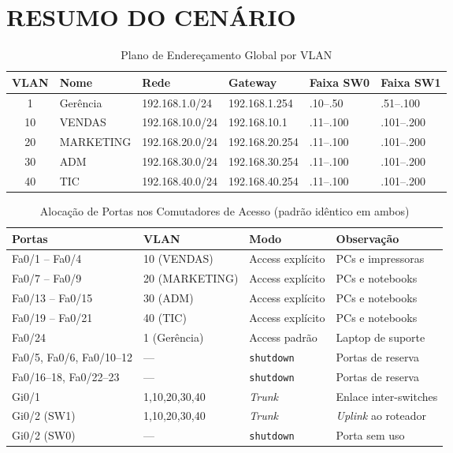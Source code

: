 \documentclass[12pt,a4paper]{article}
\begin{document}
\section{RESUMO DO CENÁRIO}

\begin{table}[htbp]
\centering
\caption{Plano de Endereçamento Global por VLAN}
\label{tab:enderecamento}
\small
\begin{tabular}{@{}clllll@{}}
\toprule
\textbf{VLAN} & \textbf{Nome} & \textbf{Rede} & \textbf{Gateway} &
\textbf{Faixa SW0} & \textbf{Faixa SW1} \\
\midrule
1  & Gerência  & 192.168.1.0/24  & 192.168.1.254   & .10–.50   & .51–.100  \\
10 & VENDAS    & 192.168.10.0/24 & 192.168.10.1    & .11–.100  & .101–.200 \\
20 & MARKETING & 192.168.20.0/24 & 192.168.20.254  & .11–.100  & .101–.200 \\
30 & ADM       & 192.168.30.0/24 & 192.168.30.254  & .11–.100  & .101–.200 \\
40 & TIC       & 192.168.40.0/24 & 192.168.40.254  & .11–.100  & .101–.200 \\
\bottomrule
\end{tabular}
\end{table}

\begin{table}[htbp]
\centering
\caption{Alocação de Portas nos Comutadores de Acesso (padrão idêntico em ambos)}
\label{tab:portas}
\small
\begin{tabular}{@{}p{4.0cm}p{2.4cm}p{2.4cm}p{3.8cm}@{}}
\toprule
\textbf{Portas} & \textbf{VLAN} & \textbf{Modo} & \textbf{Observação} \\
\midrule
Fa0/1 -- Fa0/4              & 10 (VENDAS)    & Access explícito  & PCs e impressoras \\
Fa0/7 -- Fa0/9              & 20 (MARKETING) & Access explícito  & PCs e notebooks \\
Fa0/13 -- Fa0/15            & 30 (ADM)       & Access explícito  & PCs e notebooks \\
Fa0/19 -- Fa0/21            & 40 (TIC)       & Access explícito  & PCs e notebooks \\
Fa0/24                      & 1 (Gerência)   & Access padrão     & Laptop de suporte \\
Fa0/5, Fa0/6, Fa0/10--12   & ---            & \texttt{shutdown} & Portas de reserva \\
Fa0/16--18, Fa0/22--23      & ---            & \texttt{shutdown} & Portas de reserva \\
Gi0/1                       & 1,10,20,30,40  & \textit{Trunk}    & Enlace inter-switches \\
Gi0/2 (SW1)                 & 1,10,20,30,40  & \textit{Trunk}    & \textit{Uplink} ao roteador \\
Gi0/2 (SW0)                 & ---            & \texttt{shutdown} & Porta sem uso \\
\bottomrule
\end{tabular}
\end{table}
\end{document}
